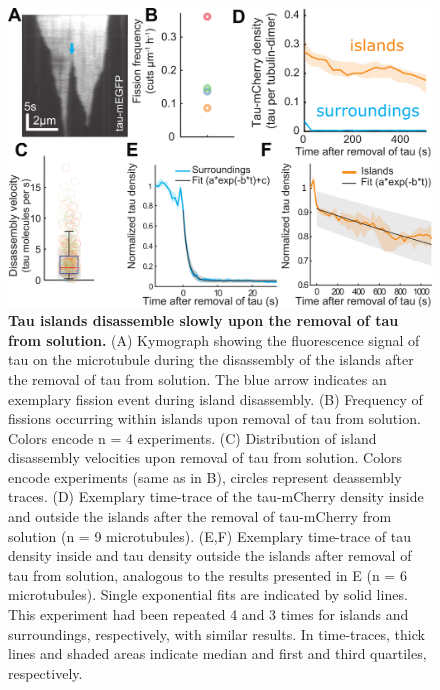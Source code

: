 \begin{figure}
	\centering
	\includegraphics[width=1\linewidth]{Figures/tauSHRINK.png}
	\caption[Tau islands disassemble slowly upon the removal of tau from solution.]{
	\textbf{Tau islands disassemble slowly upon the removal of tau from solution.} (A) Kymograph showing the fluorescence signal of tau on the microtubule during the disassembly of the islands after the removal of tau from solution. The blue arrow indicates an exemplary fission event during island disassembly. (B) Frequency of fissions occurring within islands upon removal of tau from solution. Colors encode n = 4 experiments. (C) Distribution of island disassembly velocities upon removal of tau from solution. Colors encode experiments (same as in B), circles represent deassembly traces. (D) Exemplary time-trace of the tau-mCherry density inside and outside the islands after the removal of tau-mCherry from solution (n = 9 microtubules). (E,F) Exemplary time-trace of tau density inside and tau density outside the islands after removal of tau from solution, analogous to the results presented in E (n = 6 microtubules). Single exponential fits are indicated by solid lines. This experiment had been repeated 4 and 3 times for islands and surroundings, respectively, with similar results. In time-traces, thick lines and shaded areas indicate median and first and third quartiles, respectively. 
		}\label{tauSHRINK}
\end{figure}

